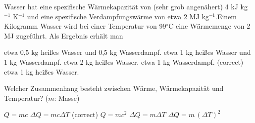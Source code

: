 \documentclass[11pt]{exam}
\begin{document}
\begin{questions}
\vspace{3mm}\question Wasser hat eine spezifische Wärmekapazität von (sehr grob angenähert) 4 kJ kg\(^{-1}\) K\(^{-1}\) und eine spezifische Verdampfungswärme von etwa 2 MJ kg\(^{-1}\).Einem Kilogramm Wasser wird bei einer Temperatur von 99\(^\circ\)C eine Wärmemenge von 2 MJ zugeführt. Als Ergebnis erhält man

\begin{choices}
	\choice etwa 0,5 kg heißes Wasser und 0,5 kg Wasserdampf.
	\choice etwa 1 kg heißes Wasser und 1 kg Wasserdampf.
	\choice etwa 2 kg heißes Wasser.
	\choice etwa 1 kg Wasserdampf. (correct)
	\choice etwa 1 kg heißes Wasser.
\end{choices}

\vspace{3mm}\question Welcher Zusammenhang besteht zwischen Wärme, Wärmekapazität und Temperatur? (\(m\): Masse)

\begin{choices}
	\choice \(Q = m c\)
	\choice \(\Delta Q = m c \Delta T\) (correct)
	\choice \(Q = m c^2\)
	\choice \(\Delta Q = m \Delta T\)
	\choice \(\Delta Q = m \, (\Delta T)^2\)
\end{choices}

\vspace{3mm}\end{questions}
\end{document}
